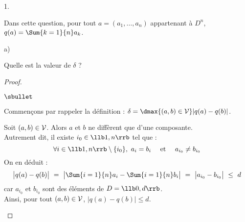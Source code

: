 \documentclass[11pt]{article}%
\begin{document}
\begin{noliste}{1.}
\item Dans cette question, pour tout $a = (a_1, \ldots ,a_n)$
  appartenant à $D^n$, $q(a) = \Sum{k=1}{n} a_k$.
  \begin{noliste}{a)}
    \setlength{\itemsep}{2mm} %
  \item Quelle est la valeur de $\delta$ ?

    \begin{proof}~%
      \begin{noliste}{$\sbullet$}
      \item Commençons par rappeler la définition : $\delta =
        \dmax{(a,b)\in\cal V} |q(a) - q(b)|$.

      \item Soit $(a, b) \in {\cal V}$. Alors $a$ et $b$ ne diffèrent
        que d'une composante.\\
        Autrement dit, il existe $i_0 \in \llb 1, n \rrb$ tel que :
        \[
        \forall i \in \llb 1, n \rrb \setminus \{i_0\}, \ a_i = b_i
        \quad \text{ et } \quad a_{i_0} \neq b_{i_0}
        \]
        On en déduit : 
        \[
        \big|q(a) - q(b)\big| \ = \ \big|\Sum{i=1}{n} a_i -
        \Sum{i=1}{n} b_i \big| \ = \ \big|a_{i_0} - b_{i_0}\big| \
        \leq \ d
        \]
        car $a_{i_0}$ et $b_{i_0}$ sont des éléments de $D = \llb 0, d
        \rrb$. \\[.1cm]
        Ainsi, pour tout $(a, b) \in {\cal V}$, $\big|q(a) - q(b)\big|
        \leq d$. %





\end{noliste}
\end{proof}
\end{noliste}
\end{noliste}
\end{document}
